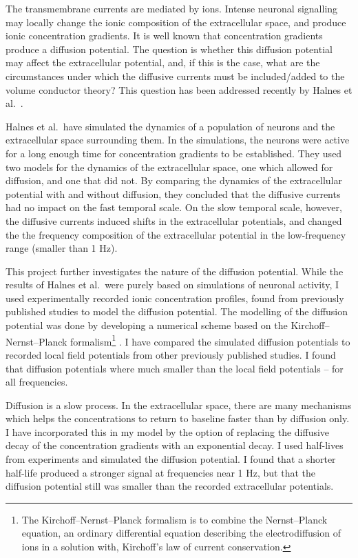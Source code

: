 \documentclass{article}
\begin{document}
The transmembrane currents are mediated by ions. Intense neuronal signalling may locally change the ionic composition of the extracellular space, and produce ionic concentration gradients. It is well known that concentration gradients produce a diffusion potential. The question is whether this diffusion potential may affect the extracellular potential, and, if this is the case, what are the circumstances under which the diffusive currents must be included/added to the volume conductor theory? This question has been addressed recently by Halnes et al.\ \cite{Halnes2016}. 

Halnes et al.\ have simulated the dynamics of a population of neurons and the extracellular space surrounding them. In the simulations, the neurons were active for a long enough time for concentration gradients to be established. They used two models for the dynamics of the extracellular space, one which allowed for diffusion, and one that did not. By comparing the dynamics of the extracellular potential with and without diffusion, they concluded that the diffusive currents had no impact on the fast temporal scale. On the slow temporal scale, however, the diffusive currents induced shifts in the extracellular potentials, and changed the the frequency composition of the extracellular potential in the low-frequency range (smaller than 1 Hz).


This project further investigates the nature of the diffusion potential. While the results of Halnes et al.\ were purely based on simulations of neuronal activity, I used experimentally recorded ionic concentration profiles, found from previously published studies to model the diffusion potential. The modelling of the diffusion potential was done by developing a numerical scheme based on the Kirchoff--Nernst--Planck formalism\footnote{The Kirchoff--Nernst--Planck formalism is to combine the Nernst--Planck equation, an ordinary differential equation describing the electrodiffusion of ions in a solution with, Kirchoff's law of current conservation.} \cite{Halnes2013}\cite{Halnes2016}.  I have compared the simulated diffusion potentials to recorded local field potentials from other previously published studies. I found that diffusion potentials where much smaller than the local field potentials -- for all frequencies. 

Diffusion is a slow process. In the extracellular space, there are many mechanisms which helps the concentrations to return to baseline faster than by diffusion only. I have incorporated this in my model by the option of replacing the diffusive decay of the concentration gradients with an exponential decay. I used half-lives from experiments and simulated the diffusion potential. I found that a shorter half-life produced a stronger signal at frequencies near 1 Hz, but that the diffusion potential still was smaller than the recorded extracellular potentials. 
\end{document}
